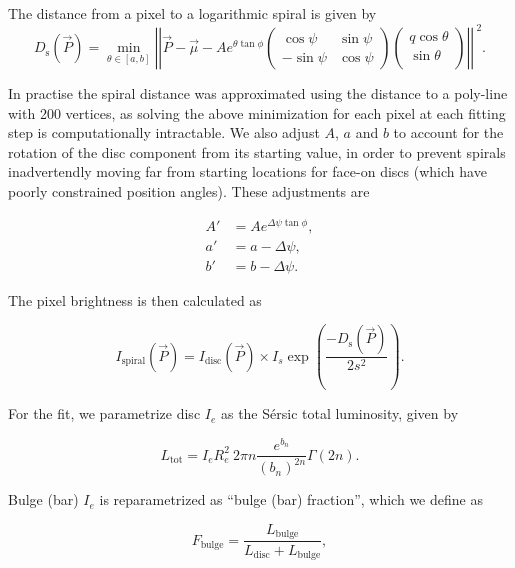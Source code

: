 \documentclass[trackchanges]{aastex63}
\begin{document}
The distance from a pixel to a logarithmic spiral is given by
\begin{equation}
  D_\mathrm{s}(\vec{P}) = \min_{\theta\in[a, b]}\left|\left|\vec{P} - \vec\mu - Ae^{\theta\tan\phi}\begin{pmatrix}
       \cos\psi & \sin\psi\\
       -\sin\psi & \cos\psi
       \end{pmatrix}
       \begin{pmatrix}
       q\cos\theta \\
       \sin\theta \\
       \end{pmatrix}
       \right|\right|^{\ 2}.
\end{equation}

In practise the spiral distance was approximated using the distance to a poly-line with 200 vertices, as solving the above minimization for each pixel at each fitting step is computationally intractable. We also adjust $A$, $a$ and $b$ to account for the rotation of the disc component from its starting value, in order to prevent spirals inadvertendly moving far from starting locations for face-on discs (which have poorly constrained position angles). These adjustments are

\begin{equation}
\begin{aligned}
  A' &= Ae^{\Delta\psi\tan\phi},\\
  a' &= a - \Delta\psi,\\
  b' &= b - \Delta\psi.
\end{aligned}
\end{equation}

The pixel brightness is then calculated as

\begin{equation}
I_\mathrm{spiral}(\vec{P}) = I_\mathrm{disc}(\vec{P}) \times I_s\exp\left(\frac{-D_\mathrm{s}(\vec{P})}{2s^2}\right).
\end{equation}

For the fit, we parametrize disc $I_e$ as the S\'ersic total luminosity, given by

\begin{equation}
L_\mathrm{tot} = I_eR_e^2\ 2\pi n\frac{e^{b_n}}{(b_n)^{2n}}\Gamma(2n).
\end{equation}

Bulge (bar) $I_e$ is reparametrized as ``bulge (bar) fraction'', which we define as

\begin{equation}
F_\mathrm{bulge} = \frac{L_\mathrm{bulge}}{L_\mathrm{disc} + L_\mathrm{bulge}},
\end{equation}
\end{document}
